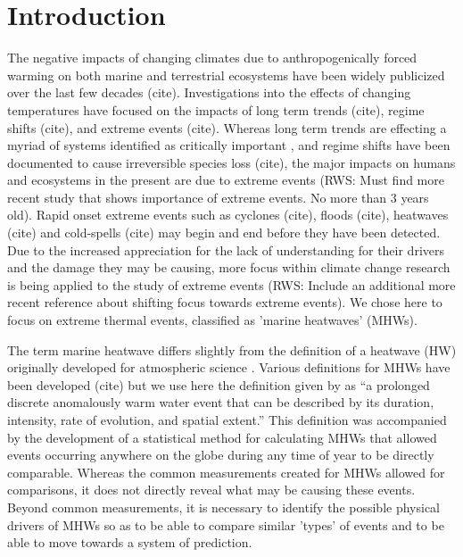 \documentclass[a4paper,10pt,review]{elsarticle}
\begin{document}
\section{Introduction}
The negative impacts of changing climates due to anthropogenically forced warming on both marine and terrestrial ecosystems have been widely publicized over the last few decades (cite). Investigations into the effects of changing temperatures have focused on the impacts of long term trends (cite), regime shifts (cite), and extreme events (cite). Whereas long term trends are effecting a myriad of systems identified as critically important \citep{IPCC2014}, and regime shifts have been documented to cause irreversible species loss (cite), the major impacts on humans and ecosystems in the present are due to extreme events \citep{Easterling2000} (RWS: Must find more recent study that shows importance of extreme events. No more than 3 years old). Rapid onset extreme events such as cyclones (cite), floods (cite), heatwaves (cite) and cold-spells (cite) may begin and end before they have been detected. Due to the increased appreciation for the lack of understanding for their drivers and the damage they may be causing, more focus within climate change research is being applied to the study of extreme events \citep{Jentsch2007}(RWS: Include an additional more recent reference about shifting focus towards extreme events). We chose here to focus on extreme thermal events, classified as 'marine heatwaves' (MHWs).

The term marine heatwave differs slightly from the definition of a heatwave (HW) originally developed for atmospheric science \citep{Perkins2013}. Various definitions for MHWs have been developed (cite) but we use here the definition given by \citet{Hobday2016} as ``a prolonged discrete anomalously warm water event that can be described by its duration, intensity, rate of evolution, and spatial extent.'' This definition was accompanied by the development of a statistical method for calculating MHWs that allowed events occurring anywhere on the globe during any time of year to be directly comparable. Whereas the common measurements created for MHWs allowed for comparisons, it does not directly reveal what may be causing these events. Beyond common measurements, it is necessary to identify the possible physical drivers of MHWs so as to be able to compare similar 'types' of events and to be able to move towards a system of prediction. 
\end{document}
